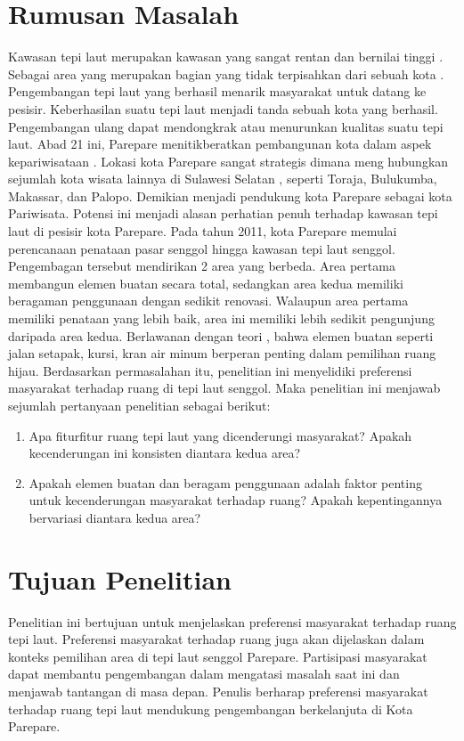 \documentclass[../projects/thesis.tex]{subfiles}
\begin{document}
\section{Rumusan Masalah}
Kawasan tepi laut merupakan kawasan yang sangat rentan dan bernilai tinggi \citep{mullin2000}. Sebagai area yang merupakan bagian yang tidak terpisahkan dari sebuah kota \citep{hussein2014}. Pengembangan tepi laut yang berhasil menarik masyarakat untuk datang ke pesisir. Keberhasilan suatu tepi laut menjadi tanda sebuah kota yang berhasil.
Pengembangan ulang dapat mendongkrak atau menurunkan kualitas suatu tepi laut. Abad 21 ini, Parepare menitikberatkan pembangunan kota dalam aspek kepariwisataan \citep{junaid2016,faniapriani2018,muh.sainals2020} . Lokasi kota Parepare sangat strategis dimana meng­ hubungkan sejumlah kota wisata lainnya di Sulawesi Selatan \citep{junaid2016}, seperti Toraja, Bulukumba, Makassar, dan Palopo. Demikian menjadi pendukung kota Parepare sebagai kota Pariwisata. Potensi ini menjadi alasan perhatian penuh terhadap kawasan tepi laut di pesisir kota Parepare.
Pada tahun 2011, kota Parepare memulai perencanaan penataan pasar senggol hingga kawasan tepi laut senggol. Pengembagan tersebut mendirikan 2 area yang berbeda. Area pertama membangun elemen buatan secara total, sedangkan area kedua memiliki beragaman penggunaan dengan sedikit renovasi. Walaupun area pertama memiliki penataan yang lebih baik, area ini memiliki lebih sedikit pengunjung daripada area kedua. Berlawanan dengan teori \citep{campagnaro2020}, bahwa elemen buatan seperti jalan setapak, kursi, kran air minum berperan penting dalam pemilihan ruang hijau. Berdasarkan permasalahan itu, penelitian ini menyelidiki preferensi masyarakat terhadap ruang di tepi laut senggol. Maka penelitian ini menjawab sejumlah pertanyaan penelitian sebagai berikut:

\begin{enumerate}
    \item Apa fitur­fitur ruang tepi laut yang dicenderungi masyarakat? Apakah kecenderungan ini konsisten diantara kedua area?
    \item Apakah elemen buatan dan beragam penggunaan adalah faktor penting untuk kecenderungan masyarakat terhadap ruang? Apakah kepentingannya bervariasi diantara kedua area?
\end{enumerate}


\section{Tujuan Penelitian}
Penelitian ini bertujuan untuk menjelaskan preferensi masyarakat terhadap ruang tepi laut. Preferensi masyarakat terhadap ruang juga akan dijelaskan dalam konteks pemilihan area di tepi laut senggol Parepare. Partisipasi masyarakat dapat membantu pengembangan dalam mengatasi masalah saat ini dan menjawab tantangan di masa depan. Penulis berharap preferensi masyarakat terhadap ruang tepi laut mendukung pengembangan berkelanjuta di Kota Parepare.
\end{document}
